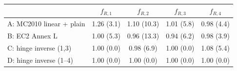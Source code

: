 \begin{tabular}{l cccc}
\toprule
 & $f_{R,1}$ & $f_{R,2}$ & $f_{R,3}$ & $f_{R,4}$\\
\midrule
A: MC2010 linear + plain & 1.26 (3.1) & 1.10 (10.3) & 1.01 (5.8) & 0.98 (4.4)\\
B: EC2 Annex L & 1.00 (5.3) & 0.96 (13.3) & 0.94 (6.2) & 0.98 (3.9)\\
C: hinge inverse (1,3) & 1.00 (0.0) & 0.98 (6.9) & 1.00 (0.0) & 1.08 (5.4)\\
D: hinge inverse (1--4) & 1.00 (0.0) & 1.00 (0.0) & 1.00 (0.0) & 1.00 (0.0)\\
\bottomrule
\end{tabular}

